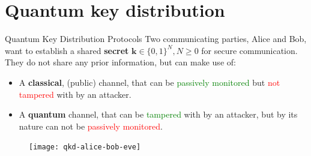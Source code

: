 \documentclass{beamer}
\begin{document}
\section{Quantum key distribution}
\begin{frame}{Quantum Key Distribution Protocols}
	Two communicating parties, Alice and Bob, want to establish a shared \textbf{secret} $\mathbf{k} \in \{0, 1\}^N, N \geq 0$ for secure communication. They do not share any prior information, but can make use of:
	\begin{itemize}
	\item A \textbf{classical}, (public) channel, that can be \textcolor{green}{passively monitored} but \textcolor{red}{not tampered} with by an attacker.
	\item A \textbf{quantum} channel, that can be \textcolor{green}{tampered} with by an attacker, but by its nature can not be \textcolor{red}{passively monitored}.
	\end{itemize}   
\begin{figure}
\centering
\texttt{[image: qkd-alice-bob-eve]}
\end{figure}
\end{frame}

%
%
%
%
\end{document}
